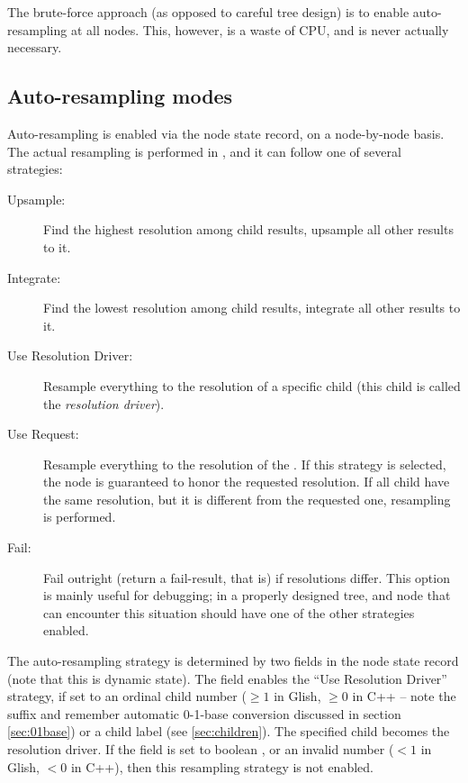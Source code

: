   The brute-force approach (as opposed to careful tree design) is to enable
  auto-resampling at all nodes. This, however, is a waste of CPU, and is never
  actually necessary.

\subsection{Auto-resampling modes}

  Auto-resampling is enabled via the node state record, on a node-by-node
  basis. The actual resampling is performed in , and it can
  follow one of several strategies:

  \begin{description}
  
  \item[Upsample:] Find the highest resolution among child results, upsample
    all other results to it.

  \item[Integrate:] Find the lowest resolution among child results,  integrate
    all other results to it.

  \item[Use Resolution Driver:] Resample everything to the resolution of a
    specific child (this child is called the {\em resolution driver}\/).

  \item[Use Request:] Resample everything to the resolution of the \Request. If
    this strategy is selected, the node is guaranteed to honor the requested
    resolution. If all child have the same resolution, but it is different from
    the requested one, resampling is performed.
    
  \item[Fail:] Fail outright (return a fail-result, that is) if resolutions
    differ. This option is mainly useful for debugging; in a properly designed
    tree, and node that can encounter this situation should have one of the 
    other strategies enabled.

  \end{description}
  
  The auto-resampling strategy is determined by two fields in the node state
  record (note that this is dynamic state). The 
  field enables the ``Use Resolution Driver'' strategy, if set to an ordinal
  child number ($\ge 1$ in Glish, $\ge 0$ in C++ -- note the  suffix
  and remember automatic 0-1-base conversion discussed in section
  \ref{sec:01base}) or a child label (see \ref{sec:children}). The specified
  child becomes the resolution driver. If the field is set to boolean
  , or an invalid number ($<1$ in Glish, $<0$ in C++), then this
  resampling strategy is not enabled.

